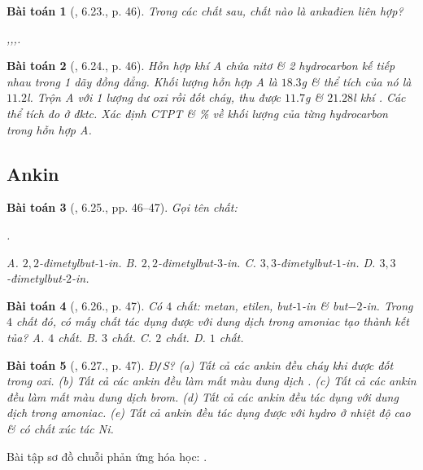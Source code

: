 \documentclass{article}
\newtheorem{baitoan}{Bài toán}
\begin{document}
\begin{baitoan}[\cite{SBT_Hoa_Hoc_11_co_ban}, 6.23., p. 46]
	Trong các chất sau, chất nào là ankađien liên hợp?
	\begin{center}
		,\hspace{5mm},\hspace{5mm}\emph{},\hspace{5mm}\emph{}.
	\end{center}
\end{baitoan}

\begin{baitoan}[\cite{SBT_Hoa_Hoc_11_co_ban}, 6.24., p. 46]
	Hỗn hợp khí A chứa nitơ \& 2 hydrocarbon kế tiếp nhau trong 1 dãy đồng đẳng. Khối lượng hỗn hợp A là $18.3$\emph{g} \& thể tích của nó là $11.2$\emph{l}. Trộn A với 1 lượng dư oxi rồi đốt cháy, thu được $11.7$\emph{g} \emph{} \& $21.28$\emph{l} khí \emph{}. Các thể tích đo ở đktc. Xác định CTPT \& \% về khối lượng của từng hydrocarbon trong hỗn hợp A.
\end{baitoan}


\subsection{Ankin}

\begin{baitoan}[\cite{SBT_Hoa_Hoc_11_co_ban}, 6.25., pp. 46--47]
	Gọi tên chất:
	\begin{center}
		.
	\end{center}
	{\sf A.} $2,2$-đimetylbut-$1$-in. {\sf B.} $2,2$-đimetylbut-$3$-in. {\sf C.} $3,3$-đimetylbut-$1$-in. {\sf D.} $3,3$-đimetylbut-$2$-in.
\end{baitoan}

\begin{baitoan}[\cite{SBT_Hoa_Hoc_11_co_ban}, 6.26., p. 47]
	Có $4$ chất: metan, etilen, but-$1$-in \& but$-2$-in. Trong $4$ chất đó, có mấy chất tác dụng được với dung dịch \emph{} trong amoniac tạo thành kết tủa? {\sf A.} $4$ chất. {\sf B.} $3$ chất. {\sf C.} $2$ chất. {\sf D.} $1$ chất.
\end{baitoan}

\begin{baitoan}[\cite{SBT_Hoa_Hoc_11_co_ban}, 6.27., p. 47]
	\emph{Đ\texttt{/}S?} (a) Tất cả các ankin đều cháy khi được đốt trong oxi. (b) Tất cả các ankin đều làm mất màu dung dịch \emph{}. (c) Tất cả các ankin đều làm mất màu dung dịch brom. (d) Tất cả các ankin đều tác dụng với dung dịch \emph{} trong amoniac. (e) Tất cả ankin đều tác dụng được với hydro ở nhiệt độ cao \& có chất xúc tác \emph{Ni}.
\end{baitoan}
Bài tập sơ đồ chuỗi phản ứng hóa học: \cite[6.28., p. 47]{SBT_Hoa_Hoc_11_co_ban}.
\end{document}
